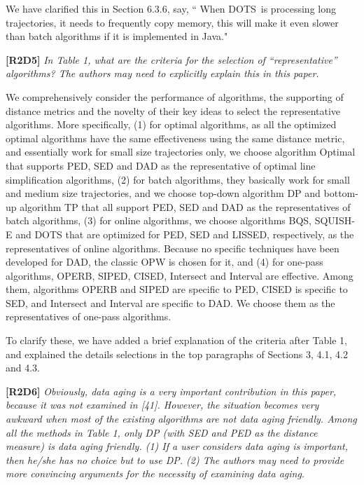 \documentclass{letter}
\begin{document}
{{We have clarified this in Section 6.3.6, say, `` When DOTS~is processing long trajectories, it needs to frequently copy memory, this will make it even slower than batch algorithms if it is implemented in Java." 




\textbf{[R2D5]} \emph{In Table 1, what are the criteria for the selection of “representative” algorithms? The authors may need to explicitly explain this in this paper.}

We comprehensively consider the performance of algorithms, the supporting of distance metrics and the novelty of their key ideas to select the representative algorithms. More specifically, 
(1) for optimal algorithms, {as all the optimized optimal algorithms have the same effectiveness using the same distance metric, and essentially work for small size trajectories only, we choose algorithm Optimal that supports PED, SED and DAD as the representative of optimal line simplification algorithms,}
%
(2) for batch algorithms, {they basically work for small and medium size trajectories, and we choose top-down algorithm DP and bottom-up algorithm TP that all support PED, SED and DAD as the representatives of batch algorithms,}
%
(3) for online algorithms, {we choose algorithms BQS, SQUISH-E and DOTS that are optimized for PED, SED and LISSED, respectively, as the representatives of online algorithms. Because no specific techniques have been developed for DAD, the classic OPW is chosen for it,} and
%
(4) for one-pass algorithms, OPERB, SIPED, CISED, Intersect and Interval are effective. Among them, algorithms OPERB and SIPED are specific to PED, CISED is specific to SED, and Intersect and Interval are specific to DAD. We choose them as the representatives of one-pass algorithms.

To clarify these, we have added a brief explanation of the criteria after Table 1, and explained the details selections in the top paragraphs of Sections 3, 4.1, 4.2 and 4.3. 

\textbf{[R2D6]} \emph{Obviously, data aging is a very important contribution in this paper, because it was not examined in [41]. However, the situation becomes very awkward when most of the existing algorithms are not data aging friendly. Among all the methods in Table 1, only DP (with SED and PED as the distance measure) is data aging friendly. (1) {If a user considers data aging is important, then he/she has no choice but to use DP}. (2) {The authors may need to provide more convincing arguments for the necessity of examining data aging}.}



}}
\end{document}
